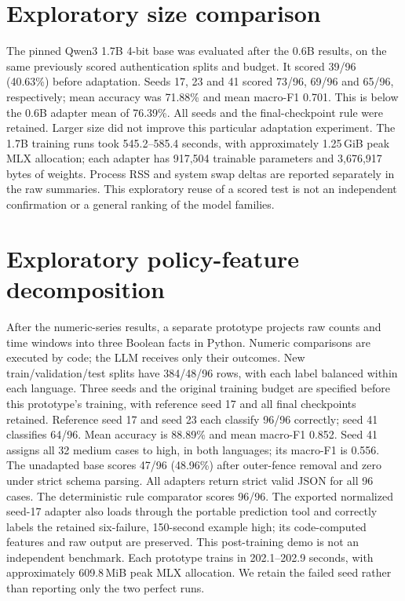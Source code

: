 \documentclass[11pt]{article}
\begin{document}
\section{Exploratory size comparison}
The pinned Qwen3 1.7B 4-bit base was evaluated after the 0.6B results, on the same previously scored authentication splits and budget. It scored 39/96 (40.63\%) before adaptation. Seeds 17, 23 and 41 scored 73/96, 69/96 and 65/96, respectively; mean accuracy was 71.88\% and mean macro-F1 0.701. This is below the 0.6B adapter mean of 76.39\%. All seeds and the final-checkpoint rule were retained. Larger size did not improve this particular adaptation experiment. The 1.7B training runs took 545.2--585.4 seconds, with approximately 1.25\,GiB peak MLX allocation; each adapter has 917,504 trainable parameters and 3,676,917 bytes of weights. Process RSS and system swap deltas are reported separately in the raw summaries. This exploratory reuse of a scored test is not an independent confirmation or a general ranking of the model families.

\section{Exploratory policy-feature decomposition}
After the numeric-series results, a separate prototype projects raw counts and time windows into three Boolean facts in Python. Numeric comparisons are executed by code; the LLM receives only their outcomes. New train/validation/test splits have 384/48/96 rows, with each label balanced within each language. Three seeds and the original training budget are specified before this prototype's training, with reference seed 17 and all final checkpoints retained. Reference seed 17 and seed 23 each classify 96/96 correctly; seed 41 classifies 64/96. Mean accuracy is 88.89\% and mean macro-F1 0.852. Seed 41 assigns all 32 medium cases to high, in both languages; its macro-F1 is 0.556. The unadapted base scores 47/96 (48.96\%) after outer-fence removal and zero under strict schema parsing. All adapters return strict valid JSON for all 96 cases. The deterministic rule comparator scores 96/96. The exported normalized seed-17 adapter also loads through the portable prediction tool and correctly labels the retained six-failure, 150-second example high; its code-computed features and raw output are preserved. This post-training demo is not an independent benchmark. Each prototype trains in 202.1--202.9 seconds, with approximately 609.8\,MiB peak MLX allocation. We retain the failed seed rather than reporting only the two perfect runs.
\end{document}
